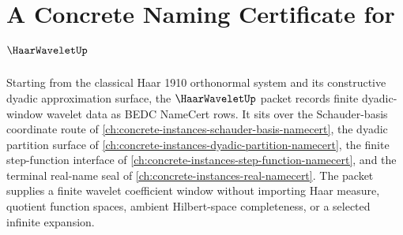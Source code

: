 \chapter{A Concrete Naming Certificate for $\HaarWaveletUp$}
\label{ch:concrete-instances-haar-wavelet-namecert}

Starting from the classical Haar 1910 orthonormal system and its constructive dyadic approximation surface, the $\HaarWaveletUp$ packet records finite dyadic-window wavelet data as BEDC NameCert rows. It sits over the Schauder-basis coordinate route of \autoref{ch:concrete-instances-schauder-basis-namecert}, the dyadic partition surface of \autoref{ch:concrete-instances-dyadic-partition-namecert}, the finite step-function interface of \autoref{ch:concrete-instances-step-function-namecert}, and the terminal real-name seal of \autoref{ch:concrete-instances-real-namecert}. The packet supplies a finite wavelet coefficient window without importing Haar measure, quotient function spaces, ambient Hilbert-space completeness, or a selected infinite expansion.

